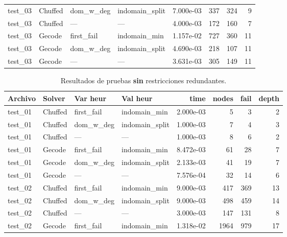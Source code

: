 \begin{compactfloats}
\begin{table}[H]
\begin{tabular}{l l l l r r r r}
    test\_03 & Chuffed & dom\_w\_deg  & indomain\_split & 7.000e-03 & 337 & 324 & 9 \\
    test\_03 & Chuffed & ---          & ---              & 4.000e-03 & 172 & 160 & 7 \\
    test\_03 & Gecode  & first\_fail  & indomain\_min   & 1.157e-02 & 727 & 360 & 11 \\
    test\_03 & Gecode  & dom\_w\_deg  & indomain\_split & 4.690e-03 & 218 & 107 & 11 \\
    test\_03 & Gecode  & ---          & ---              & 3.631e-03 & 305 & 149 & 11 \\
    \bottomrule
  \end{tabular}
\end{table}

\begin{table}[H]
  \centering
  \small
  \setlength{\tabcolsep}{2.8pt}
  \caption{Resultados de pruebas \textbf{sin} restricciones redundantes.}
  \label{tab:pruebas-sudoku-off}
  \begin{tabular}{l l l l r r r r}
    \toprule
    \textbf{Archivo} & \textbf{Solver} & \textbf{Var heur} & \textbf{Val heur} & \textbf{time} & \textbf{nodes} & \textbf{fail} & \textbf{depth} \\
    \midrule
    test\_01 & Chuffed & first\_fail  & indomain\_min   & 2.000e-03 & 5   & 3   & 2 \\
    test\_01 & Chuffed & dom\_w\_deg  & indomain\_split & 1.000e-03 & 7   & 4   & 3 \\
    test\_01 & Chuffed & ---          & ---              & 1.000e-03 & 8   & 6   & 2 \\
    test\_01 & Gecode  & first\_fail  & indomain\_min   & 8.472e-03 & 61  & 28  & 7 \\
    test\_01 & Gecode  & dom\_w\_deg  & indomain\_split & 2.133e-03 & 41  & 19  & 7 \\
    test\_01 & Gecode  & ---          & ---              & 7.576e-04 & 32  & 14  & 6 \\
    \midrule
    test\_02 & Chuffed & first\_fail  & indomain\_min   & 9.000e-03 & 417 & 369 & 13 \\
    test\_02 & Chuffed & dom\_w\_deg  & indomain\_split & 9.000e-03 & 498 & 459 & 14 \\
    test\_02 & Chuffed & ---          & ---              & 3.000e-03 & 147 & 131 & 8 \\
    test\_02 & Gecode  & first\_fail  & indomain\_min   & 1.318e-02 & 1964 & 979 & 17 \\

\end{tabular}
\end{table}
\end{compactfloats}
